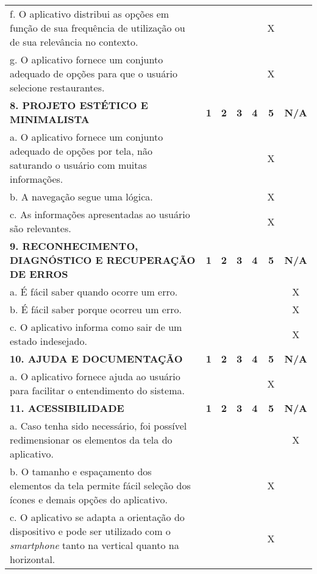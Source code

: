 \documentclass[portuguese,oneside]{tcc}
\begin{document}
\begin{table}[h]
{\begin{tabu}{|L{25em}|c|c|c|c|c|c|}
							f. O aplicativo distribui as opções em função de sua frequência de utilização ou de sua relevância no contexto.	& & & & & X & \\ 
							g. O aplicativo fornece um conjunto adequado de opções para que o usuário selecione restaurantes. & & & & & X & \\ 
							\textbf{8. PROJETO ESTÉTICO E MINIMALISTA} & \textbf{1} & \textbf{2} & \textbf{3} & \textbf{4} & \textbf{5} & \textbf{N/A} \\ 
							a. O aplicativo fornece um conjunto adequado de opções por tela, não saturando o usuário com muitas informações. & & & & & X & \\ 
							b. A navegação segue uma lógica. & & & & & X & \\ 
							c. As informações apresentadas ao usuário são relevantes. & & & & & X & \\ 
							\textbf{9. RECONHECIMENTO, DIAGNÓSTICO E RECUPERAÇÃO DE ERROS} & \textbf{1} & \textbf{2} & \textbf{3} & \textbf{4} & \textbf{5} & \textbf{N/A} \\ 
							a. É fácil saber quando ocorre um erro.	& & & & & & X \\ 
							b. É fácil saber porque ocorreu um erro. & & & & & & X \\ 
							c. O aplicativo informa como sair de um estado indesejado. & & & & & & X \\ 
							\textbf{10. AJUDA E DOCUMENTAÇÃO} & \textbf{1} & \textbf{2} & \textbf{3} & \textbf{4} & \textbf{5} & \textbf{N/A} \\ 
							a. O aplicativo fornece ajuda ao usuário para facilitar o entendimento do sistema. & & & & & X & \\ 
							\textbf{11. ACESSIBILIDADE} & \textbf{1} & \textbf{2} & \textbf{3} & \textbf{4} & \textbf{5} & \textbf{N/A} \\ 
							a. Caso tenha sido necessário, foi possível redimensionar os elementos da tela do aplicativo. & & & & & & X \\ 
							b. O tamanho e espaçamento dos elementos da tela permite fácil seleção dos ícones e demais opções do aplicativo. & & & & & X & \\ 
							c. O aplicativo se adapta a orientação do dispositivo e pode ser utilizado com o \emph{smartphone} tanto na vertical quanto na horizontal. & & & & & X & \\ 

\end{tabu}}
\end{table}
\end{document}
